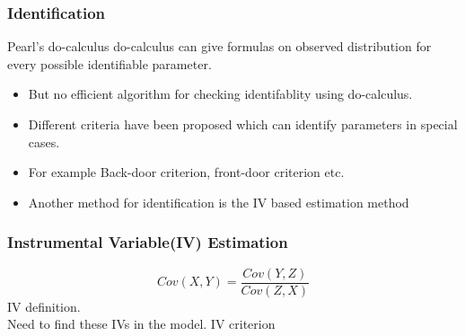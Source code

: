 \documentclass{beamer}
\begin{document}
\begin{frame}
	\frametitle{Identification}
	\begin{block}{Pearl's do-calculus}
		do-calculus can give formulas on observed distribution for 
		every possible identifiable parameter.
	\end{block}
	\begin{itemize}
		\item But no efficient algorithm for checking identifablity using
			do-calculus.
		\item Different criteria have been proposed which can identify 
			parameters in special cases.
		\item For example Back-door criterion, front-door criterion etc.
		\item Another method for identification is the IV based estimation 
			method
	\end{itemize}
\end{frame}

\begin{frame}
	\frametitle{Instrumental Variable(IV) Estimation}
	\begin{figure}
		\centering
	\end{figure}
	$$ Cov(X, Y) = \frac{Cov(Y, Z)}{Cov(Z, X)} $$
	IV definition. \\
	Need to find these IVs in the model. IV criterion
\end{frame}
\end{document}
